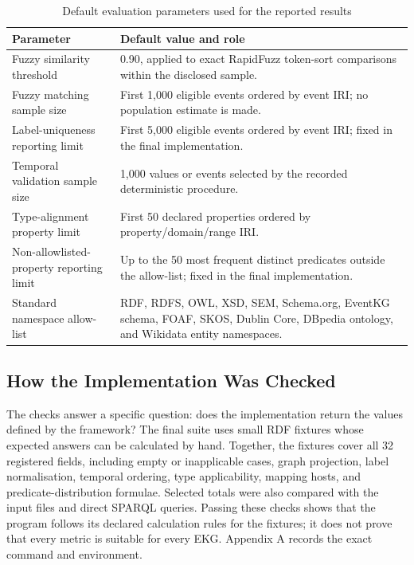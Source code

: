 \begin{table}[H]
\centering
\caption{Default evaluation parameters used for the reported results}
\label{tab:default_parameters}
\begin{tabularx}{\textwidth}{lX}
\toprule
\textbf{Parameter} & \textbf{Default value and role} \\
\midrule
Fuzzy similarity threshold & 0.90, applied to exact RapidFuzz token-sort comparisons within the disclosed sample. \\
Fuzzy matching sample size & First 1,000 eligible events ordered by event IRI; no population estimate is made. \\
Label-uniqueness reporting limit & First 5,000 eligible events ordered by event IRI; fixed in the final implementation. \\
Temporal validation sample size & 1,000 values or events selected by the recorded deterministic procedure. \\
Type-alignment property limit & First 50 declared properties ordered by property/domain/range IRI. \\
Non-allowlisted-property reporting limit & Up to the 50 most frequent distinct predicates outside the allow-list; fixed in the final implementation. \\
Standard namespace allow-list & RDF, RDFS, OWL, XSD, SEM, Schema.org, EventKG schema, FOAF, SKOS, Dublin Core, DBpedia ontology, and Wikidata entity namespaces. \\
\bottomrule
\end{tabularx}
\end{table}

\subsection{How the Implementation Was Checked}
\label{sec:validation}

The checks answer a specific question: does the implementation return the values defined by the framework? The final suite uses small RDF fixtures whose expected answers can be calculated by hand. Together, the fixtures cover all 32 registered fields, including empty or inapplicable cases, graph projection, label normalisation, temporal ordering, type applicability, mapping hosts, and predicate-distribution formulae. Selected totals were also compared with the input files and direct SPARQL queries. Passing these checks shows that the program follows its declared calculation rules for the fixtures; it does not prove that every metric is suitable for every EKG. Appendix A records the exact command and environment.

